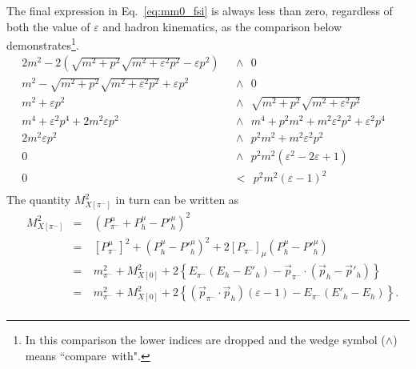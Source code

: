 The final expression in Eq.~\eqref{eq:mm0_fsi} is always less than zero, regardless of both the value of $\varepsilon$ and hadron kinematics, as the comparison below demonstrates\footnote[7]{In this comparison the lower indices are dropped and the wedge symbol ($\wedge$) means ``compare~with".}.
\vspace{-0.3em}
\begin{equation}
\begin{aligned}
2m^{2} - 2(\sqrt{m^{2}+p^{2}}\sqrt{m^{2}+\varepsilon^{2}p^{2}}-\varepsilon p^{2})& ~~\wedge~~ 0&\\
m^{2} - \sqrt{m^{2}+p^{2}}\sqrt{m^{2}+\varepsilon^{2}p^{2}} +\varepsilon p^{2} &~~\wedge~~ 0&\\
m^{2}+\varepsilon p^{2} &~~\wedge~~ \sqrt{m^{2}+p^{2}}\sqrt{m^{2}+\varepsilon^{2}p^{2}}&\\
m^{4}+\varepsilon^{2}p^{4}+2m^{2}\varepsilon p^{2} &~~\wedge~~ m^{4} + p^{2}m^{2} + m^{2}\varepsilon^{2}p^{2}+\varepsilon^{2}p^{4}&\\
2m^{2}\varepsilon p^{2} &~~\wedge~~ p^{2}m^{2}+  m^{2}\varepsilon^{2}p^{2}&\\
0 &~~\wedge~~ p^{2}m^{2}(\varepsilon^{2}-2\varepsilon+1)&\\
0&~~<~~ p^{2}m^{2}(\varepsilon-1)^{2}&\\[-8pt]
\end{aligned}\label{eq:comp}
\end{equation}
The quantity $M_{X[\pi^{-}]}^{2}$ in turn can be written as\vspace{-0.35em}
\begin{equation}
\begin{aligned}
&M_{X[\pi^{-}]}^{2}&=&~(P^{\mu}_{\pi^{-}}+ P^{\mu}_{h} -P'^{\mu}_{h})^{2} \\
&&=&~[P^{\mu}_{\pi^{-}}]^{2} +(P^{\mu}_{h} -P'^{\mu}_{h})^{2}+2\left [P_{\pi^{-}}\right ]_{\mu} \left (P^{\mu}_{h} -P'^{\mu}_{h}\right ) \\
&&=&~m_{\pi^{-}}^{2} + M_{X[0]}^{2} +2\left \{E_{\pi^{-}}(E_{h}-E'_{h}) - \overrightarrow{p}_{\pi^{-}}\cdot(\overrightarrow{p}_{h} - \overrightarrow{p}'_{h})\right \}\\
&&=&~m_{\pi^{-}}^{2} + M_{X[0]}^{2} +2\left \{(\overrightarrow{p}_{\pi^{-}}\cdot \overrightarrow{p}_{h})(\varepsilon-1) - E_{\pi^{-}}(E'_{h}-E_{h})\right \}.\\[-7pt]
\end{aligned}\label{eq:mm_pim_fsi}
\end{equation}




